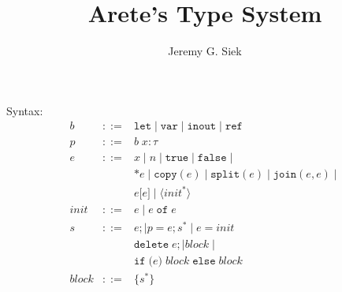 \documentclass{article}
\title{Arete's Type System}
\author{Jeremy G. Siek}
\begin{document}
\maketitle

Syntax:
\[
\begin{array}{rcl}
  b &::= & \mathtt{let} \mid \mathtt{var} \mid \mathtt{inout}
         \mid \mathtt{ref}\\
  p &::= & b \; x : \tau \\
  e &::= & x \mid n \mid \mathtt{true} \mid \mathtt{false} \mid\\
    & & \mathtt{*} e \mid \mathtt{copy}(e) \mid
        \mathtt{split}(e) \mid \mathtt{join}(e,e) \mid \\
    & & e\texttt{[}e\texttt{]} \mid \langle \mathit{init}^{*} \rangle \\
  \mathit{init} & ::= & e \mid e \mathop{\mathtt{of}} e \\
  s &::= & e; \mid p = e; s^{*} \mid e = \mathit{init}\\
  & & \mathtt{delete}\; e; \mid \mathit{block} \mid \\
  & & \mathtt{if}\; \texttt{(}e\texttt{)}\; \mathit{block}\;\mathtt{else}\; \mathit{block}\\
  \mathit{block} &::= & \{ s^{*} \}
\end{array}
\]
\end{document}

